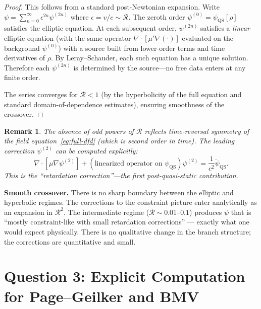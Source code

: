 \documentclass[12pt,a4paper]{article}
\newtheorem{remark}{Remark}[section]
\begin{document}
\begin{proof}
This follows from a standard post-Newtonian expansion. Write
$\psi = \sum_{n=0}^\infty \epsilon^{2n}\psi^{(2n)}$ where
$\epsilon = v/c \sim \mathcal{R}$. The zeroth order
$\psi^{(0)} = \psi_\mathrm{QS}[\rho]$ satisfies the elliptic equation.
At each subsequent order, $\psi^{(2n)}$ satisfies a \emph{linear}
elliptic equation (with the same operator
$\nabla\cdot[\mu'\nabla(\cdot)]$ evaluated on the background
$\psi^{(0)}$) with a source built from lower-order terms and time
derivatives of $\rho$. By Leray--Schauder, each such equation has a
unique solution. Therefore each $\psi^{(2n)}$ is determined by the
source---no free data enters at any finite order.

The series converges for $\mathcal{R} < 1$ (by the hyperbolicity of the
full equation and standard domain-of-dependence estimates), ensuring
smoothness of the crossover.
\end{proof}

\begin{remark}
The absence of odd powers of $\mathcal{R}$ reflects time-reversal
symmetry of the field equation~\eqref{eq:full-dfd} (which is second
order in time). The leading correction $\psi^{(2)}$ can be computed
explicitly:
\begin{equation}
\nabla\cdot[\mu\nabla\psi^{(2)}]
+ (\text{linearized operator on }\psi_\mathrm{QS})\psi^{(2)}
= \frac{1}{c^2}\ddot\psi_\mathrm{QS}.
\end{equation}
This is the ``retardation correction''---the first post-quasi-static
contribution.
\end{remark}

\begin{tcolorbox}[colback=blue!5!white, colframe=dfdblue,
title=Answer to Q2]
\textbf{Smooth crossover.} There is no sharp boundary between the
elliptic and hyperbolic regimes. The corrections to the constraint
picture enter analytically as an expansion in $\mathcal{R}^2$. The
intermediate regime ($\mathcal{R} \sim 0.01$--$0.1$) produces $\psi$
that is ``mostly constraint-like with small retardation corrections''
--- exactly what one would expect physically. There is no qualitative
change in the branch structure; the corrections are quantitative and
small.
\end{tcolorbox}


\section{Question 3: Explicit Computation for Page--Geilker and BMV}
\label{sec:Q3}
\end{document}
